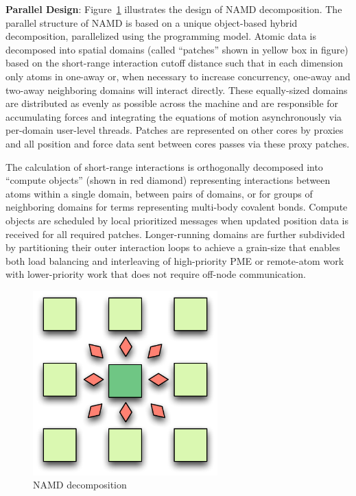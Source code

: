 \textbf{Parallel Design}: Figure~\ref{figs:parallelmd} illustrates the design of NAMD decomposition.
The parallel structure of NAMD is based on a unique object-based
hybrid decomposition, parallelized using the \charmpp{} programming model.
Atomic data is decomposed into spatial domains (called ``patches''
shown in yellow box in figure) based on the short-range
interaction cutoff distance such that in each dimension only atoms in
one-away or, when necessary to increase concurrency, one-away and two-away
neighboring domains will interact directly.
These equally-sized domains are distributed as evenly as possible across
the machine and are responsible for accumulating forces and integrating
the equations of motion asynchronously via per-domain user-level threads.
Patches are represented on other cores by proxies and all position
and force data sent between cores passes via these proxy patches.

The calculation of short-range interactions is orthogonally decomposed
into ``compute objects'' (shown in red diamond) representing interactions between atoms within
a single domain, between pairs of domains, or for groups of neighboring
domains for terms representing multi-body covalent bonds.
Compute objects are scheduled by local prioritized \charmpp{} messages
when updated position data is received for all required patches.
Longer-running domains are further subdivided by partitioning their outer
interaction loops to achieve a grain-size that enables both load balancing
and interleaving of high-priority PME or remote-atom work with
lower-priority work that does not require off-node communication.

\begin{figure}[h]
\centering
\includegraphics[width=2.8in]{figs/parallelmd}
\caption{NAMD decomposition}
\label{figs:parallelmd}
\vspace{-0.2cm}
\end{figure}

